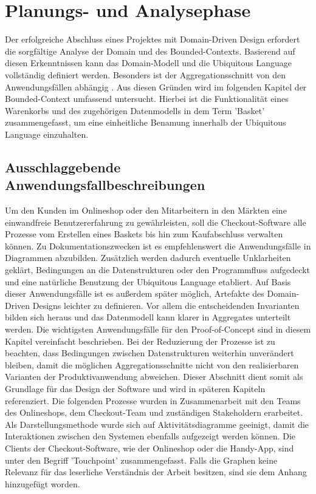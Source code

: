 

\chapter{Planungs- und Analysephase}

Der erfolgreiche Abschluss eines Projektes mit Domain-Driven Design erfordert die sorgfältige Analyse der Domain und des Bounded-Contexts. Basierend auf diesen Erkenntnissen kann das Domain-Modell und die Ubiquitous Language vollständig definiert werden. Besonders ist der Aggregationsschnitt von den Anwendungsfällen abhängig \cite[S. 358]{Vernon.2015}. Aus diesen Gründen wird im folgenden Kapitel der Bounded-Context umfassend untersucht. Hierbei ist die Funktionalität eines Warenkorbs und des zugehörigen Datenmodells in dem Term 'Basket' zusammengefasst, um eine einheitliche Benamung innerhalb der Ubiquitous Language einzuhalten. 

\section{Ausschlaggebende Anwendungsfallbeschreibungen}


Um den Kunden im Onlineshop oder den Mitarbeitern in den Märkten eine einwandfreie Benutzererfahrung zu gewährleisten, soll die Checkout-Software alle Prozesse vom Erstellen eines Baskets bis hin zum Kaufabschluss verwalten können. Zu Dokumentationszwecken ist es empfehlenswert die Anwendungsfälle in Diagrammen abzubilden. Zusätzlich werden dadurch eventuelle Unklarheiten geklärt, Bedingungen an die Datenstrukturen oder den Programmfluss aufgedeckt und eine natürliche Benutzung der Ubiquitous Language etabliert. Auf Basis dieser Anwendungsfälle ist es außerdem später möglich, Artefakte des Domain-Driven Designs leichter zu definieren. Vor allem die entscheidenden Invarianten bilden sich heraus und das Datenmodell kann klarer in Aggregates unterteilt werden. Die wichtigsten Anwendungsfälle für den Proof-of-Concept sind in diesem Kapitel vereinfacht beschrieben. Bei der Reduzierung der Prozesse ist zu beachten, dass Bedingungen zwischen Datenstrukturen weiterhin unverändert bleiben, damit die möglichen Aggregationsschnitte nicht von den realisierbaren Varianten der Produktivanwendung abweichen. Dieser Abschnitt dient somit als Grundlage für das Design der Software und wird in späteren Kapiteln referenziert. Die folgenden Prozesse wurden in Zusammenarbeit mit den Teams des Onlineshops, dem Checkout-Team und zuständigen \Gls{Stakeholder}n erarbeitet. Als Darstellungsmethode wurde sich auf Aktivitätsdiagramme geeinigt, damit die Interaktionen zwischen den Systemen ebenfalls aufgezeigt werden können. Die Clients der Checkout-Software, wie der Onlineshop oder die Handy-App, sind unter den Begriff 'Touchpoint' zusammengefasst. Falls die Graphen keine Relevanz für das leserliche Verständnis der Arbeit besitzen, sind sie dem Anhang hinzugefügt worden. 


